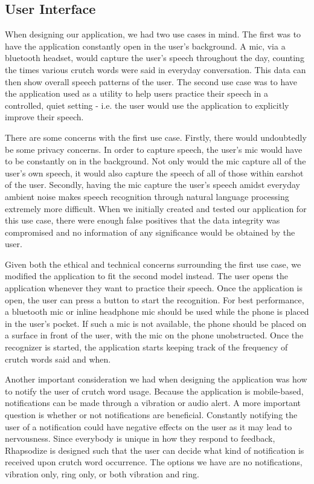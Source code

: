 \documentclass{sigchi}
\begin{document}
\subsection{User Interface}

When designing our application, we had two use cases in mind. The first was to have the application constantly open in the user’s background. A mic, via a bluetooth headset, would capture the user’s speech throughout the day, counting the times various crutch words were said in everyday conversation. This data can then show overall speech patterns of the user. The second use case was to have the application used as a utility to help users practice their speech in a controlled, quiet setting - i.e. the user would use the application to explicitly improve their speech. 

There are some concerns with the first use case. Firstly, there would undoubtedly be some privacy concerns. In order to capture speech, the user’s mic would have to be constantly on in the background. Not only would the mic capture all of the user’s own speech, it would also capture the speech of all of those within earshot of the user. Secondly, having the mic capture the user’s speech amidst everyday ambient noise makes speech recognition through natural language processing extremely more difficult. When we initially created and tested our application for this use case, there were enough false positives that the data integrity was compromised and no information of any significance would be obtained by the user.

Given both the ethical and technical concerns surrounding the first use case, we modified the application to fit the second model instead. The user opens the application whenever they want to practice their speech. Once the application is open, the user can press a button to start the recognition. For best performance, a bluetooth mic or inline headphone mic should be used while the phone is placed in the user’s pocket. If such a mic is not available, the phone should be placed on a surface in front of the user, with the mic on the phone unobstructed. Once the recognizer is started, the application starts keeping track of the frequency of crutch words said and when. 

Another important consideration we had when designing the application was how to notify the user of crutch word usage. Because the application is mobile-based, notifications can be made through a vibration or audio alert. A more important question is whether or not notifications are beneficial. Constantly notifying the user of a notification could have negative effects on the user as it may lead to nervousness. Since everybody is unique in how they respond to feedback, Rhapsodize is designed such that the user can decide what kind of notification is received upon crutch word occurrence. The options we have are no notifications, vibration only, ring only, or both vibration and ring. 
\end{document}
